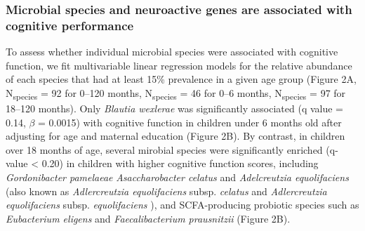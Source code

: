 \documentclass{article}
\begin{document}
\subsubsection*{Microbial species and neuroactive genes are associated with cognitive performance}

To assess whether individual microbial species were associated with
cognitive function, we fit multivariable linear regression models
\cite{mallickMultivariableAssociationDiscovery2021}
for the relative abundance of each species that had at least 15\%
prevalence in a given age group (Figure 2A, N\textsubscript{species} = 92 for 0--120 months, 
N\textsubscript{species} = 46 for 0--6 months, N\textsubscript{species} = 97 for 18--120 months).
Only \emph{Blautia wexlerae} was significantly associated (q value = 0.14, $\beta$ = 0.0015) with
cognitive function in children under 6 months old after adjusting for
age and maternal education (Figure 2B).
By contrast, in children over 18 months of age,
several mirobial species were significantly enriched (q-value
\textless{} 0.20) in children with higher cognitive function scores,
including \emph{Gordonibacter pamelaeae}
\emph{Asaccharobacter celatus} and \emph{Adelcreutzia equolifaciens}
(also known as \textit{Adlercreutzia equolifaciens} subsp. \textit{celatus}
and \textit{Adlercreutzia equolifaciens} subsp. \textit{equolifaciens} \cite{maruoAdlercreutziaEquolifaciensGen2008}),
and SCFA-producing probiotic
species such as \emph{Eubacterium eligens} and \emph{Faecalibacterium
prausnitzii}
\cite{ghoshMediterraneanDietIntervention2020}
(Figure 2B).
\end{document}
